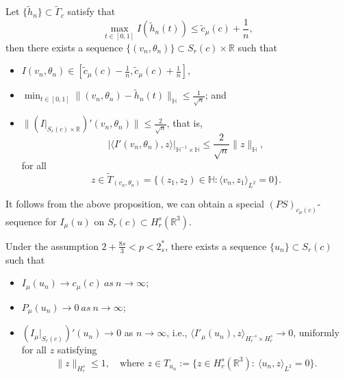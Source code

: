 \documentclass[reqno]{amsart}
\begin{document}
\begin{lemma}\label{lem5.4} 
Let $\{\tilde{h}_n\}\subset \tilde{\Gamma}_c $ satisfy that
$$
\max_{t\in[0,1]}I(\tilde{h}_n(t))\leq \tilde{c}_\mu (c)+\frac{1}{n},
$$
then there exists a sequence $\{(v_n, \theta_n)\}\subset S_{r}(c)\times \mathbb{R}$ 
such that
\begin{itemize}
\item[(i)] $I{(v_n, \theta_n)}\in [\tilde{c}_\mu (c)-\frac{1}{n}, 
 \tilde{c}_\mu (c)+\frac{1}{n}]$,
 
\item[(ii)] $\min_{t\in[0,1]}\|(v_n, \theta_n)-\tilde{h}_n(t)\|_{\mathbb{H}}
\leq \frac{1}{\sqrt{n}}$; and

\item[(iii)] $\|(I|_{S_{r}(c)\times \mathbb{R}})'(v_n, \theta_n)\|
 \leq \frac{2}{\sqrt{n}}$, that is,
$$
|\langle I'(v_n, \theta_n), z\rangle|_{\mathbb{H}^{-1}\times \mathbb{H}}
\leq \frac{2}{\sqrt{n}} \|z\|_{\mathbb{H}},
$$
for all
$$ 
{z\in {\tilde{T}_{(v_n, \theta_n)}}}=\{(z_1, z_2)\in \mathbb{H}: 
{\langle v_n, z_1\rangle}_{L^2}=0\}.
$$
\end{itemize}
\end{lemma}


It follows from the above proposition, we can obtain a special 
$(PS)_{{c}_\mu (c)}$-sequence for $I_\mu(u)$ on $S_{r}(c)\subset H^s_r(\mathbb{R}^3)$.

\begin{lemma}\label{lem5.5} 
Under the  assumption $2+\frac{8s}{3}<p<2^*_s$, there exists a sequence
$\{u_n\} \subset S_{r}(c)$ such that
\begin{itemize}
\item[(1)] $I_\mu(u_n)\to c_\mu(c) ~as~ n\to \infty$;

\item[(2)] $P_\mu(u_n)\to 0 ~as~ n\to \infty$;

\item[(3)] $(I_\mu|_{S_{r}(c)})'(u_n)\to 0$  as $n\to \infty$, i.e., 
$\langle I'_\mu(u_n), z\rangle_{{H^{-s}_r} \times H^s_r} \to 0$, 
uniformly for all $z$ satisfying
$$
\|z\|_{H^s_r}\leq 1,\quad \text{where } z\in T_{u_n} 
:=\{z\in {H^s_r(\mathbb{R}^3)}:~\langle u_n,z \rangle_{L^2}=0\}.
$$
\end{itemize}
\end{lemma}
\end{document}
